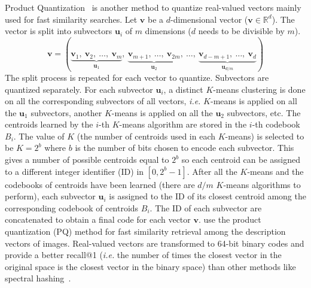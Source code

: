     Product Quantization~\citep{jegou2010product} is another method to quantize
    real-valued vectors mainly used for fast similarity searches. Let
    $\mathbf{v}$ be a $d$-dimensional vector ($\mathbf{v} \in \mathbb{R}^d$).
    The vector is split into subvectors $\mathbf{u}_i$ of $m$ dimensions ($d$
    needs to be divisible by $m$).
    \begin{equation}
      \mathbf{v} = (
      \underbrace{\mathbf{v}_1,~\mathbf{v}_2,~\dots,~\mathbf{v}_m
                 }_{\mathbf{u}_1},~
      \underbrace{\mathbf{v}_{m+1},~\dots,~\mathbf{v}_{2m}
                 }_{\mathbf{u}_2},~\dots,~
      \underbrace{\mathbf{v}_{d-m+1},~\dots,~\mathbf{v}_d
                 }_{\mathbf{u}_{d/m}}
      )
    \end{equation}
    The split process is repeated for each vector to quantize. Subvectors are
    quantized separately. For each subvector $\mathbf{u}_i$, a distinct
    $K$-means clustering is done on all the corresponding subvectors of all
    vectors, \textit{i.e.} $K$-means is applied on all the $\mathbf{u}_1$
    subvectors, another $K$-means is applied on all the $\mathbf{u}_2$
    subvectors, etc. The centroids learned by the $i$-th $K$-means algorithm are
    stored in the $i$-th codebook $B_i$. The value of $K$ (the number of
    centroids used in each $K$-means) is selected to be $K = 2^b$ where $b$ is
    the number of bits chosen to encode each subvector. This gives a number of
    possible centroids equal to $2^b$ so each centroid can be assigned to a
    different integer identifier (ID) in $[0, 2^{b}-1]$. After all the $K$-means
    and the codebooks of centroids have been learned (there are $d/m$ $K$-means
    algorithms to perform), each subvector $\mathbf{u}_i$ is assigned to the ID
    of its closest centroid among the corresponding codebook of centroids $B_i$.
    The ID of each subvector are concatenated to obtain a final code for each
    vector $\mathbf{v}$. \citet{jegou2010product} use the product quantization
    (PQ) method for fast similarity retrieval among the description vectors of
    images. Real-valued vectors are transformed to 64-bit binary codes and
    provide a better recall@1 (\textit{i.e.} the number of times the closest
    vector in the original space is the closest vector in the binary space) than
    other methods like spectral hashing~\citep{weiss2009spectral}.\medskip

